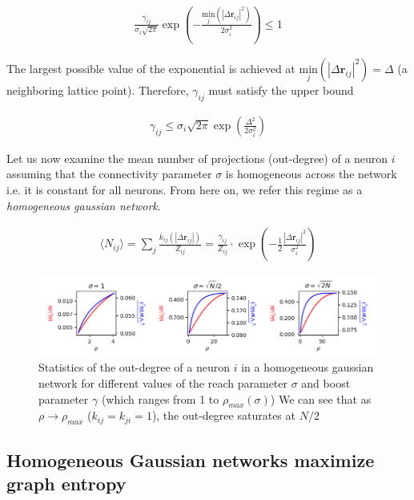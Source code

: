 \documentclass{ucetd}
\begin{document}
\begin{align*}
\frac{\gamma_{ij}}{\sigma_{i}\sqrt{2\pi}}\exp\left(-\frac{\underset{j}{\mathrm{min}}\left(|\Delta\mathbf{r}_{ij}|^{2}\right)}{2\sigma_{i}^{2}} \right) \leq 1
\end{align*}

The largest possible value of the exponential is achieved at $\underset{j}{\mathrm{min}}\left(|\Delta\mathbf{r}_{ij}|^{2}\right) = \Delta$ (a neighboring lattice point). Therefore, $\gamma_{ij}$ must satisfy the upper bound

\begin{align*}
\gamma_{ij} \leq \sigma_{i}\sqrt{2\pi}\exp\left(\frac{\Delta^{2}}{2\sigma_{i}^{2}}\right)
\end{align*}

Let us now examine the mean number of projections (out-degree) of a neuron $i$ assuming that the connectivity parameter $\sigma$ is homogeneous across the network i.e. it is constant for all neurons. From here on, we refer this regime as a \emph{homogeneous gaussian network}.

\begin{align*}
\langle N_{ij} \rangle = \sum_{j} \frac{k_{ij}(|\Delta\mathbf{r}_{ij}|)}{Z_{ij}} = \frac{\gamma_{ij}}{Z_{ij}}\cdot \exp\left(-\frac{1}{2}\frac{|\Delta\mathbf{r}_{ij}|^{2}}{\sigma_{i}^{2}} \right)
\end{align*}


\begin{figure}
\centering
\includegraphics[width=165mm]{fig_8}
\caption{Statistics of the out-degree of a neuron $i$ in a homogeneous gaussian network for different values of the reach parameter $\sigma$ and boost parameter $\gamma$ (which ranges from 1 to $\rho_{max}(\sigma)$) We can see that as $\rho \rightarrow \rho_{max}$ ($k_{ij} = k_{ji} = 1$), the out-degree saturates at $N/2$}
\end{figure}



\subsection{Homogeneous Gaussian networks maximize graph entropy}
\end{document}
